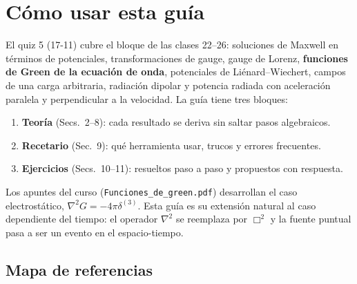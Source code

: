 \documentclass[11pt,a4paper]{article}
\newcommand{\boxop}{\Box^2}
\theoremstyle{remark}
\begin{document}
\section{Cómo usar esta guía}

El quiz 5 (17-11) cubre el bloque de las clases 22--26: soluciones de Maxwell en términos de
potenciales, transformaciones de gauge, gauge de Lorenz, \textbf{funciones de Green de la ecuación
de onda}, potenciales de Liénard--Wiechert, campos de una carga arbitraria, radiación dipolar y
potencia radiada con aceleración paralela y perpendicular a la velocidad. La guía tiene tres bloques:
\begin{enumerate}[itemsep=0.2em]
\item \textbf{Teoría} (Secs.~2--8): cada resultado se deriva sin saltar pasos algebraicos.
\item \textbf{Recetario} (Sec.~9): qué herramienta usar, trucos y errores frecuentes.
\item \textbf{Ejercicios} (Secs.~10--11): resueltos paso a paso y propuestos con respuesta.
\end{enumerate}

Los apuntes del curso (\texttt{Funciones\_de\_green.pdf}) desarrollan el caso electrostático,
$\nabla^2G=-4\pi\delta^{(3)}$. Esta guía es su extensión natural al caso dependiente del tiempo:
el operador $\nabla^2$ se reemplaza por $\boxop$ y la fuente puntual pasa a ser un evento en el
espacio-tiempo.

\subsection{Mapa de referencias}
\end{document}
